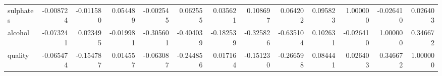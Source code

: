 \begin{tabular}{lrrrrrrrrrrrr}
sulphates            &      -0.008724 &         -0.011580 &     0.054489 &       -0.002545 &   0.062555 &             0.035621 &              0.108697 &  0.064202 &  0.095823 &   1.000000 & -0.026410 &  0.026403 \\
alcohol              &      -0.073241 &          0.023495 &    -0.019981 &       -0.305601 &  -0.404039 &            -0.182539 &             -0.325826 & -0.635104 &  0.102631 &  -0.026410 &  1.000000 &  0.346672 \\
quality              &      -0.065474 &         -0.154787 &     0.014557 &       -0.063087 &  -0.244856 &             0.017164 &             -0.151230 & -0.266598 &  0.084441 &   0.026403 &  0.346672 &  1.000000 \\
\bottomrule
\end{tabular}